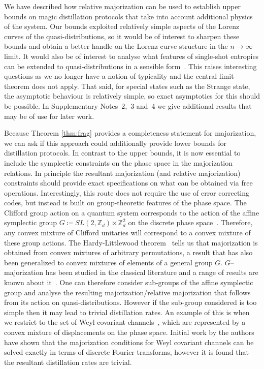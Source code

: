 \documentclass[
onecolumn,
superscriptaddress
]{revtex4-1}
\begin{document}
We have described how relative majorization can be used to establish upper bounds on magic distillation protocols that take into account additional physics of the system. Our bounds exploited relatively simple aspects of the Lorenz curves of the quasi-distributions, so it would be of interest to sharpen these bounds and obtain a better handle on the Lorenz curve structure in the $n\rightarrow \infty$ limit. It would also be of interest to analyse what features of single-shot entropies can be extended to quasi-distributions in a sensible form~\cite{renner_phd, tomamichel2013}. This raises interesting questions as we no longer have a notion of typicality and the central limit theorem does not apply. That said, for special states such as the Strange state, the asymptotic behaviour is relatively simple, so exact asymptotics for this should be possible. In Supplementary Notes~2,~3 and~4 we give additional results that may be of use for later work.

Because Theorem \ref{thm:frag}  provides a completeness statement for majorization, we can ask if this approach could additionally provide lower bounds for distillation protocols. In contrast to the upper bounds, it is now essential to include the symplectic constraints on the phase space in the majorization relations. In principle the resultant majorization (and relative majorization) constraints should provide exact specifications on what can be obtained via free operations. 
Interestingly, this route does not require the use of error correcting codes, but instead is built on group-theoretic features of the phase space. 
The Clifford group action on a quantum system corresponds to the action of the affine symplectic group $G \coloneqq SL(2,\mathbb{Z}_d) \ltimes \mathbb{Z}_d^2$ on the discrete phase space~\cite{Appleby_2005, Bengtsson_2006}. Therefore, any convex mixture of Clifford unitaries will correspond to a convex mixture of these group actions. The Hardy-Littlewood theorem~\cite{hardy_1952} tells us that majorization is obtained from convex mixtures of arbitrary permutations, a result that has also been generalized to convex mixtures of elements of a general group $G$. $G$--majorization has been studied in the classical literature and a range of results are known about it~\cite{giovagnoli_1985, steerneman_1990, giovagnoli_cyclic_1996, eaton_1977}. 
One can therefore consider sub-groups of the affine symplectic group and analyse the resulting majorization/relative majorization that follows from its action on quasi-distributions. However if the sub-group considered is too simple then it may lead to trivial distillation rates. An example of this is when we restrict to the set of Weyl covariant channels~\cite{fukuda2006}, which are represented by a convex mixture of displacements on the phase space. Initial work by the authors have shown that the majorization conditions for Weyl covariant channels can be solved exactly in terms of discrete Fourier transforms, however it is found that the resultant distillation rates are trivial.  
\end{document}
